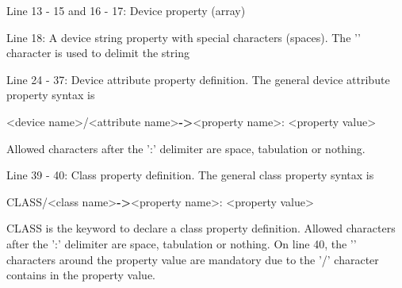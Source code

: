 Line 13 - 15 and 16 - 17: Device property (array)

Line 18: A device string property with special characters (spaces).
The '\textquotedbl{}' character is used to delimit the string

Line 24 - 37: Device attribute property definition. The general device
attribute property syntax is \begin{center}<device name>/<attribute
name>\textbf{->}<property name>: <property value>\end{center}Allowed
characters after the ':' delimiter are space, tabulation or nothing.

Line 39 - 40: Class property definition. The general class property
syntax is \begin{center}CLASS/<class name>\textbf{->}<property name>:
<property value>\end{center}\textquotedbl{}CLASS\textquotedbl{} is
the keyword to declare a class property definition. Allowed characters
after the ':' delimiter are space, tabulation or nothing. On line
40, the '\textquotedbl{}' characters around the property value are
mandatory due to the '/' character contains in the property value.
